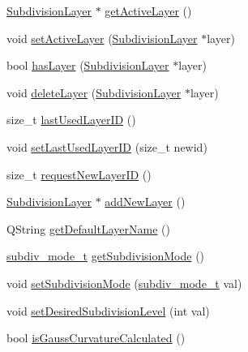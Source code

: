 \begin{DoxyCompactItemize}
\item 
\hyperlink{classShipCAD_1_1SubdivisionLayer}{Subdivision\-Layer} $\ast$ \hyperlink{classShipCAD_1_1SubdivisionSurface_a490d7a6fef79ba56fd36395208b46ba5}{get\-Active\-Layer} ()
\item 
void \hyperlink{classShipCAD_1_1SubdivisionSurface_a69bafa71111e562a52a089be99b47871}{set\-Active\-Layer} (\hyperlink{classShipCAD_1_1SubdivisionLayer}{Subdivision\-Layer} $\ast$layer)
\item 
bool \hyperlink{classShipCAD_1_1SubdivisionSurface_aef9fe9a74054b54292f7f64e0589743c}{has\-Layer} (\hyperlink{classShipCAD_1_1SubdivisionLayer}{Subdivision\-Layer} $\ast$layer)
\item 
void \hyperlink{classShipCAD_1_1SubdivisionSurface_a3f0dac49106056562a8b675c61918abe}{delete\-Layer} (\hyperlink{classShipCAD_1_1SubdivisionLayer}{Subdivision\-Layer} $\ast$layer)
\item 
size\-\_\-t \hyperlink{classShipCAD_1_1SubdivisionSurface_a46966d7372d20e563fddc48d6bbcab8a}{last\-Used\-Layer\-I\-D} ()
\item 
void \hyperlink{classShipCAD_1_1SubdivisionSurface_aa72a8cf7c5bddaaf24ec41ad3480fe70}{set\-Last\-Used\-Layer\-I\-D} (size\-\_\-t newid)
\item 
size\-\_\-t \hyperlink{classShipCAD_1_1SubdivisionSurface_a3af3a30b53d867b2b25f9ac9290a264a}{request\-New\-Layer\-I\-D} ()
\item 
\hyperlink{classShipCAD_1_1SubdivisionLayer}{Subdivision\-Layer} $\ast$ \hyperlink{classShipCAD_1_1SubdivisionSurface_a5bf8f452664e17dae636d4b66a66eba9}{add\-New\-Layer} ()
\item 
Q\-String \hyperlink{classShipCAD_1_1SubdivisionSurface_aaefc455563a01176551f61e583f0555f}{get\-Default\-Layer\-Name} ()
\item 
\hyperlink{namespaceShipCAD_a4a9d1acfd6a2e1e9078a5dcc36f0c817}{subdiv\-\_\-mode\-\_\-t} \hyperlink{classShipCAD_1_1SubdivisionSurface_a77ac47de5e6323271f45be37223fe82b}{get\-Subdivision\-Mode} ()
\item 
void \hyperlink{classShipCAD_1_1SubdivisionSurface_a048dce00d2ff87aa5b31319ea41f565a}{set\-Subdivision\-Mode} (\hyperlink{namespaceShipCAD_a4a9d1acfd6a2e1e9078a5dcc36f0c817}{subdiv\-\_\-mode\-\_\-t} val)
\item 
void \hyperlink{classShipCAD_1_1SubdivisionSurface_a53271216c1be89154c08d2b2841f9a60}{set\-Desired\-Subdivision\-Level} (int val)
\item 
bool \hyperlink{classShipCAD_1_1SubdivisionSurface_aa6e07e073f76fb31d013103c8709f923}{is\-Gauss\-Curvature\-Calculated} ()

\end{DoxyCompactItemize}
